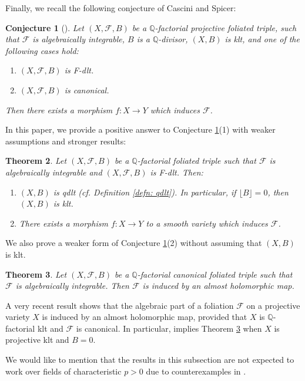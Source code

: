 \documentclass[11pt]{amsart}
\numberwithin{equation}{section}
\newcommand{\Qq}{\mathbb{Q}}
\newcommand{\Ff}{\mathcal{F}}
\newtheorem{thm}{Theorem}[subsection]
\newtheorem{conj}[thm]{Conjecture}
\theoremstyle{definition}
\theoremstyle{definition}
\theoremstyle{definition}
\begin{document}
Finally, we recall the following conjecture of Cascini and Spicer:

\begin{conj}[{\cite[Conjecture 4.2]{CS23a}}]\label{conj: cs23 4.2(1)}
Let $(X,\Ff,B)$ be a $\Qq$-factorial projective foliated triple, such that $\Ff$ is algebraically integrable, $B$ is a $\Qq$-divisor, $(X,B)$ is klt, and one of the following cases hold:
\begin{enumerate}
    \item $(X,\Ff,B)$ is F-dlt.
    \item $(X,\Ff,B)$ is canonical. 
\end{enumerate}
 Then there exists a morphism $f: X\rightarrow Y$ which induces $\Ff$. 
\end{conj}
In this paper, we provide a positive answer to Conjecture \ref{conj: cs23 4.2(1)}(1) with weaker assumptions and stronger results:
\begin{thm}\label{thm: cs23 4.2(1)}
    Let $(X,\Ff,B)$ be a $\Qq$-factorial foliated triple such that $\Ff$ is algebraically integrable and $(X,\Ff,B)$ is F-dlt. Then:
    \begin{enumerate}
    \item $(X,B)$ is qdlt (cf. Definition \ref{defn: qdlt}). In particular, if $\lfloor B\rfloor=0$, then $(X,B)$ is klt.
    \item There exists a morphism $f: X\rightarrow Y$ to a smooth variety which induces $\Ff$.
    \end{enumerate}
\end{thm}

We also prove a weaker form of Conjecture \ref{conj: cs23 4.2(1)}(2) without assuming that $(X,B)$ is klt.
\begin{thm}\label{thm: canonical almost holomorphic}
    Let $(X,\Ff,B)$ be a $\Qq$-factorial canonical foliated triple such that $\Ff$ is algebraically integrable. Then $\Ff$ is induced by an almost holomorphic map.
\end{thm}
A very recent result \cite[Theorem 1.4]{CS23b} shows that the algebraic part of a foliation $\Ff$ on a projective variety $X$ is induced by an almost holomorphic map, provided that $X$ is $\Qq$-factorial klt and $\Ff$ is canonical. In particular, \cite[Theorem 1.4]{CS23b} implies Theorem \ref{thm: canonical almost holomorphic} when $X$ is projective klt and $B=0$.

We would like to mention that the results in this subsection are not expected to work over fields of characteristic $p>0$ due to counterexamples in \cite{Ber23}.
\end{document}
